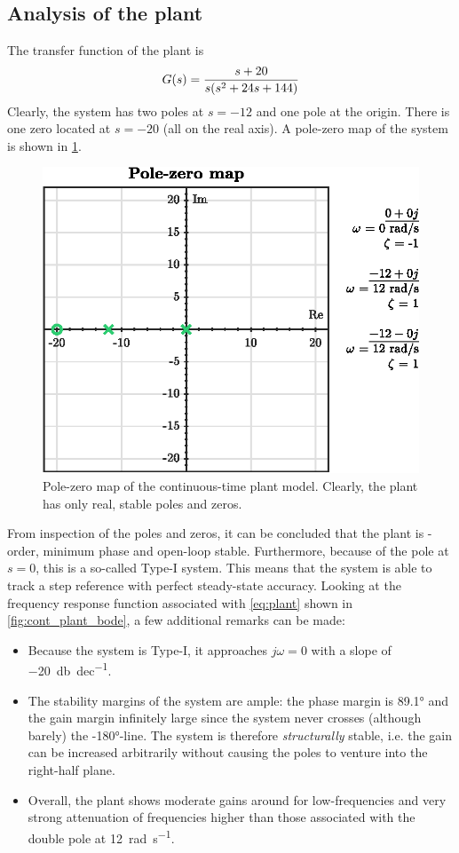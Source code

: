 \subsection{Analysis of the plant}
\label{sec:plant}
The transfer function of the plant is
\begin{equation}
    G(s) = \frac{s+20}{s\qty(s^2 + 24s + 144)}
    \label{eq:plant}
\end{equation}
Clearly, the system has two poles at $s = -12$ and one pole at the origin. There is one zero located at $s = -20$ (all on the real axis). A pole-zero map of the system is shown in \cref{fig:cont_plant_pzmap}. 
\begin{figure}[ht]
    \centering
    \includegraphics[]{media/q1/cont_plant_pzmap.eps}
    \caption{Pole-zero map of the continuous-time plant model. Clearly, the plant has only real, stable poles and zeros.}
    \label{fig:cont_plant_pzmap}
\end{figure}
From inspection of the poles and zeros, it can be concluded that the plant is -order, minimum phase and open-loop stable. Furthermore, because of the pole at $s = 0$, this is a so-called Type-I system. This means that the system is able to track a step reference with perfect steady-state accuracy. Looking at the frequency response function associated with \cref{eq:plant} shown in \cref{fig:cont_plant_bode}, a few additional remarks can be made:
\begin{itemize}
    \item Because the system is Type-I, it approaches $j\omega = 0$ with a slope of \SI{-20}{\decibel\per dec}.
    \item The stability margins of the system are ample: the phase margin is \ang{89.1} and the gain margin infinitely large since the system never crosses (although barely) the \ang{-180}-line. The system is therefore \textit{structurally} stable, i.e. the gain can be increased arbitrarily without causing the poles to venture into the right-half plane.
    \item Overall, the plant shows moderate gains around for low-frequencies and very strong attenuation of frequencies higher than those associated with the double pole at \SI{12}{\radian\per\second}.
\end{itemize}


